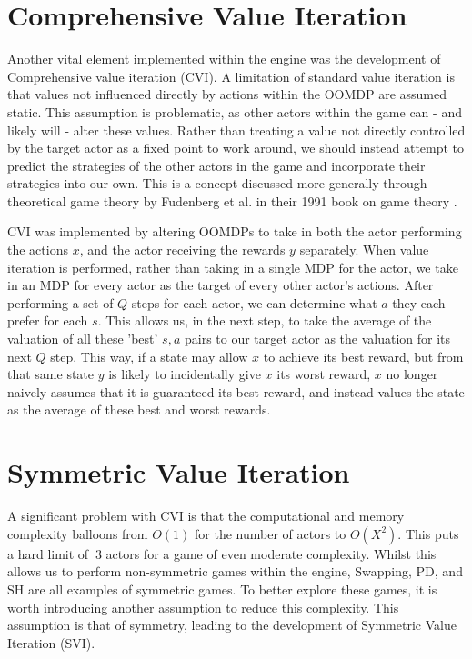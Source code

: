 \section{Comprehensive Value Iteration}

Another vital element implemented within the engine was the development of Comprehensive value iteration (CVI). A limitation of standard value iteration is that values not influenced directly by actions within the OOMDP are assumed static. This assumption is problematic, as other actors within the game can - and likely will - alter these values. Rather than treating a value not directly controlled by the target actor as a fixed point to work around, we should instead attempt to predict the strategies of the other actors in the game and incorporate their strategies into our own. This is a concept discussed more generally through theoretical game theory by Fudenberg et al. in their 1991 book on game theory \cite{fudenberg1991game}.

CVI was implemented by altering OOMDPs to take in both the actor performing the actions $x$, and the actor receiving the rewards $y$ separately. When value iteration is performed, rather than taking in a single MDP for the actor, we take in an MDP for every actor as the target of every other actor's actions. After performing a set of $Q$ steps for each actor, we can determine what $a$ they each prefer for each $s$. This allows us, in the next step, to take the average of the valuation of all these 'best' $s,a$ pairs to our target actor as the valuation for its next $Q$ step. This way, if a state may allow $x$ to achieve its best reward, but from that same state $y$ is likely to incidentally give $x$ its worst reward, $x$ no longer naively assumes that it is guaranteed its best reward, and instead values the state as the average of these best and worst rewards.

\section{Symmetric Value Iteration}

A significant problem with CVI is that the computational and memory complexity balloons from $O(1)$ for the number of actors to $O(X^2)$. This puts a hard limit of $~3$ actors for a game of even moderate complexity. Whilst this allows us to perform non-symmetric games within the engine, Swapping, PD, and SH are all examples of symmetric games. To better explore these games, it is worth introducing another assumption to reduce this complexity. This assumption is that of symmetry, leading to the development of Symmetric Value Iteration (SVI).

